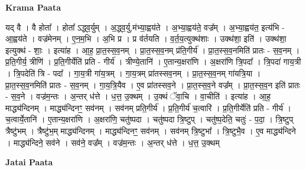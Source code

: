 \documentclass[17pt]{extarticle}
\begin{document}
\textbf{Krama Paata} \newline

यद् वै । वै होता᳚ । होता᳚ ऽद्ध्व॒र्युम् । अ॒द्ध्व॒र्यु,म॑भ्या॒ह्वय॑ते । अ॒भ्या॒ह्वय॑ते॒ वज्र᳚म् । अ॒भ्या॒ह्वय॑त॒ इत्य॑भि - आ॒ह्वय॑ते । वज्र॑मेनम् । ए॒न॒म॒भि । अ॒भि प्र । प्र व॑र्तयति । व॒र्त॒य॒त्युक्थ॑शाः । उक्थ॑शा॒ इति॑ । उक्थ॑शा॒ इत्युक्थ॑ - शाः॒ । इत्या॑ह । आ॒ह॒ प्रा॒त॒स्स॒व॒नम् । प्रा॒त॒स्स॒व॒नम् प्र॑ति॒गीर्य॑ । प्रा॒त॒स्स॒व॒नमिति॑ प्रातः - स॒व॒नम् । प्र॒ति॒गीर्य॒ त्रीणि॑ । प्र॒ति॒गीर्येति॑ प्रति - गीर्य॑ । त्रीण्ये॒तानि॑ । ए॒तान्य॒क्षरा॑णि । अ॒क्षरा॑णि त्रि॒पदा᳚ । त्रि॒पदा॑ गाय॒त्री । त्रि॒पदेति॑ त्रि - पदा᳚ । गा॒य॒त्री गा॑य॒त्रम् । गा॒य॒त्रम् प्रा॑तस्सव॒नम् । प्रा॒त॒स्स॒व॒नम् गा॑यत्रि॒या । प्रा॒त॒स्स॒व॒नमिति॑ प्रातः - स॒व॒नम् । गा॒य॒त्रि॒यैव । ए॒व प्रा॑तस्सव॒ने । प्रा॒त॒स्स॒व॒ने वज्र᳚म् । प्रा॒त॒स्स॒व॒न इति॑ प्रातः - स॒व॒ने । वज्र॑म॒न्तः । अ॒न्तर् ध॑त्ते । ध॒त्त॒ उ॒क्थम् । उ॒क्थं ॅवा॒चि । वा॒चीति॑ । इत्या॑ह । आ॒ह॒ माद्ध्य॑न्दिनम् । माद्ध्य॑न्दिनꣳ॒॒ सव॑नम् । सव॑नम् प्रति॒गीर्य॑ । प्र॒ति॒गीर्य॑ च॒त्वारि॑ । प्र॒ति॒गीर्येति॑ प्रति - गीर्य॑ । च॒त्वार्ये॒तानि॑ । ए॒तान्य॒क्षरा॑णि । अ॒क्षरा॑णि॒ चतु॑ष्पदा । चतु॑ष्पदा त्रि॒ष्टुप् । चतु॑ष्प॒देति॒ चतुः॑ - प॒दा॒ । त्रि॒ष्टुप् त्रैष्टु॑भम् । त्रैष्टु॑भ॒म् माद्ध्य॑न्दिनम् । माद्ध्य॑न्दिनꣳ॒॒ सव॑नम् । सव॑नम् त्रि॒ष्टुभा᳚ । त्रि॒ष्टुभै॒व । ए॒व माद्ध्य॑न्दिने । माद्ध्य॑न्दिने॒ सव॑ने । सव॑ने॒ वज्र᳚म् । वज्र॑म॒न्तः । अ॒न्तर् ध॑त्ते । ध॒त्त॒ उ॒क्थम् \newline

\textbf{Jatai Paata} \newline
\end{document}

